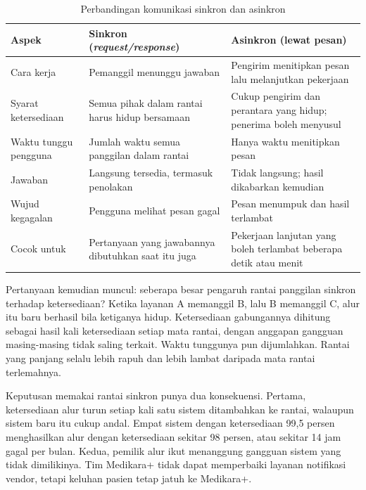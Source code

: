 \begin{table}[!htb]
  \centering
  \caption{Perbandingan komunikasi sinkron dan asinkron}
  \label{tab:ch09-sinkron-asinkron}
  \footnotesize
  \begin{tabularx}{\textwidth}{>{\raggedright\arraybackslash}p{2.4cm} >{\raggedright\arraybackslash}X >{\raggedright\arraybackslash}X}
    \hline
    \textbf{Aspek} & \textbf{Sinkron (\textit{request/response})} & \textbf{Asinkron (lewat
      pesan)} \\ \hline
    Cara kerja & Pemanggil menunggu jawaban & Pengirim menitipkan pesan lalu melanjutkan pekerjaan
      \\ \hline
    Syarat ketersediaan & Semua pihak dalam rantai harus hidup bersamaan & Cukup pengirim dan
      perantara yang hidup; penerima boleh menyusul \\ \hline
    Waktu tunggu pengguna & Jumlah waktu semua panggilan dalam rantai & Hanya waktu menitipkan
      pesan \\ \hline
    Jawaban & Langsung tersedia, termasuk penolakan & Tidak langsung; hasil dikabarkan kemudian
      \\ \hline
    Wujud kegagalan & Pengguna melihat pesan gagal & Pesan menumpuk dan hasil terlambat \\ \hline
    Cocok untuk & Pertanyaan yang jawabannya dibutuhkan saat itu juga & Pekerjaan lanjutan yang
      boleh terlambat beberapa detik atau menit \\ \hline
  \end{tabularx}
\end{table}

Pertanyaan kemudian muncul: seberapa besar pengaruh rantai panggilan sinkron terhadap ketersediaan?
Ketika layanan A memanggil B, lalu B memanggil C, alur itu baru berhasil bila ketiganya hidup.
Ketersediaan gabungannya dihitung sebagai hasil kali ketersediaan setiap mata rantai, dengan anggapan
gangguan masing-masing tidak saling terkait. Waktu tunggunya pun dijumlahkan. Rantai yang panjang
selalu lebih rapuh dan lebih lambat daripada mata rantai terlemahnya.

Keputusan memakai rantai sinkron punya dua konsekuensi. Pertama, ketersediaan alur turun setiap kali
satu sistem ditambahkan ke rantai, walaupun sistem baru itu cukup andal. Empat sistem dengan
ketersediaan 99,5 persen menghasilkan alur dengan ketersediaan sekitar 98 persen, atau sekitar 14 jam
gagal per bulan. Kedua, pemilik alur ikut menanggung gangguan sistem yang tidak dimilikinya. Tim
Medikara+ tidak dapat memperbaiki layanan notifikasi vendor, tetapi keluhan pasien tetap jatuh ke
Medikara+.

